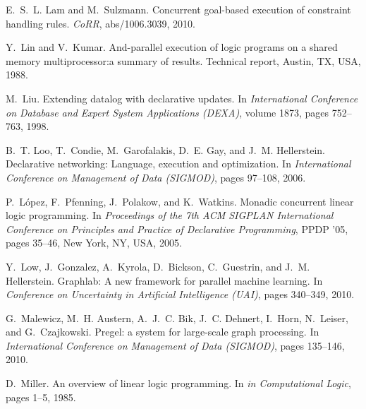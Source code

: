 \documentclass{sigplanconf}
\begin{document}
\begin{thebibliography}{35}
E.~S.~L. Lam and M.~Sulzmann.
\newblock Concurrent goal-based execution of constraint handling rules.
\newblock \emph{CoRR}, abs/1006.3039, 2010.

Y.~Lin and V.~Kumar.
\newblock And-parallel execution of logic programs on a shared memory
  multiprocessor:a summary of results.
\newblock Technical report, Austin, TX, USA, 1988.

M.~Liu.
\newblock Extending datalog with declarative updates.
\newblock In \emph{International Conference on Database and Expert System
  Applications (DEXA)}, volume 1873, pages 752--763, 1998.

B.~T. Loo, T.~Condie, M.~Garofalakis, D.~E. Gay, and J.~M. Hellerstein.
\newblock Declarative networking: Language, execution and optimization.
\newblock In \emph{International Conference on Management of Data (SIGMOD)},
  pages 97--108, 2006.

P.~L\'{o}pez, F.~Pfenning, J.~Polakow, and K.~Watkins.
\newblock Monadic concurrent linear logic programming.
\newblock In \emph{Proceedings of the 7th ACM SIGPLAN International Conference
  on Principles and Practice of Declarative Programming}, PPDP '05, pages
  35--46, New York, NY, USA, 2005.

Y.~Low, J.~Gonzalez, A.~Kyrola, D.~Bickson, C.~Guestrin, and J.~M. Hellerstein.
\newblock Graphlab: {A} new framework for parallel machine learning.
\newblock In \emph{Conference on Uncertainty in Artificial Intelligence (UAI)},
  pages 340--349, 2010.

G.~Malewicz, M.~H. Austern, A.~J.~C. Bik, J.~C. Dehnert, I.~Horn, N.~Leiser,
  and G.~Czajkowski.
\newblock Pregel: a system for large-scale graph processing.
\newblock In \emph{International Conference on Management of Data (SIGMOD)},
  pages 135--146, 2010.

D.~Miller.
\newblock An overview of linear logic programming.
\newblock In \emph{in Computational Logic}, pages 1--5, 1985.


\end{thebibliography}
\end{document}
